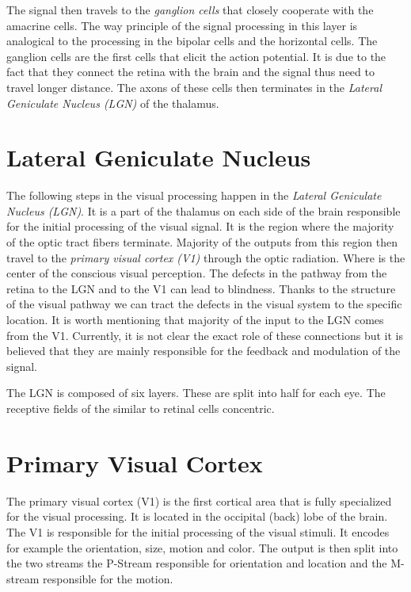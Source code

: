 The signal then travels to the \emph{ganglion cells} that closely cooperate with the 
amacrine cells. The way principle of the signal processing in this layer is analogical to 
the processing in the bipolar cells and the horizontal cells. The ganglion cells are the 
first cells that elicit the action potential. It is due to the fact that they connect the
retina with the brain and the signal thus need to travel longer distance. The axons of these
cells then terminates in the \emph{Lateral Geniculate Nucleus (LGN)} of the thalamus.

\section{Lateral Geniculate Nucleus}
\label{sec:lgn}
The following steps in the visual processing happen in the 
\emph{Lateral Geniculate Nucleus (LGN)}. It is a part of the thalamus on each side of the 
brain responsible for the initial processing of the visual signal. It is the region where
the majority of the optic tract fibers terminate. Majority of the outputs from this region
then travel to the \emph{primary visual cortex (V1)} through the optic radiation. Where is
the center of the conscious visual perception. The defects in the pathway from the retina 
to the LGN and to the V1 can lead to blindness. Thanks to the structure of the visual
pathway we can tract the defects in the visual system to the specific location. It 
is worth mentioning that majority of the input to the LGN comes from the V1. Currently, 
it is not clear the exact role of these connections but it is believed that they are mainly
responsible for the feedback and modulation of the signal.

The LGN is composed of six layers. These are split into half for each eye. The receptive
fields of the similar to retinal cells concentric.

\section{Primary Visual Cortex}
\label{sec:v1}
The primary visual cortex (V1) is the first cortical area that is fully specialized for 
the visual processing. It is located in the occipital (back) lobe of the brain. The 
V1 is responsible for the initial processing of the visual stimuli. It encodes for example
the orientation, size, motion and color. The output is then split into the two streams
the P-Stream responsible for orientation and location and the M-stream responsible for 
the motion.

